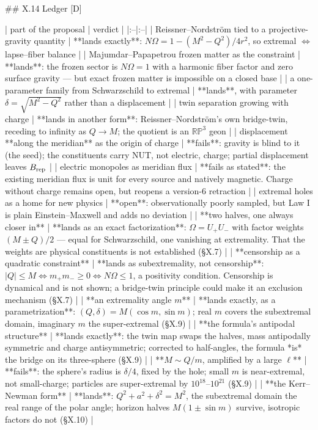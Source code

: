 ## X.14 Ledger [D]

| part of the proposal | verdict |
|:--|:--|
| Reissner–Nordström tied to a projective-gravity quantity | **lands exactly**: $N\Omega = 1-(M^2-Q^2)/4r^2$, so extremal $\Leftrightarrow$ lapse–fiber balance |
| Majumdar–Papapetrou frozen matter as the constraint | **lands**: the frozen sector is $N\Omega = 1$ with a harmonic fiber factor and zero surface gravity — but exact frozen matter is impossible on a closed base |
| a one-parameter family from Schwarzschild to extremal | **lands**, with parameter $\delta = \sqrt{M^2-Q^2}$ rather than a displacement |
| twin separation growing with charge | **lands in another form**: Reissner–Nordström's own bridge-twin, receding to infinity as $Q\to M$; the quotient is an $\mathbb{RP}^3$ geon |
| displacement **along the meridian** as the origin of charge | **fails**: gravity is blind to it (the seed); the constituents carry NUT, not electric, charge; partial displacement leaves $B_{\rm rep}$ |
| electric monopoles as meridian flux | **fails as stated**: the existing meridian flux is unit for every source and natively magnetic. Charge without charge remains open, but reopens a version-6 retraction |
| extremal holes as a home for new physics | **open**: observationally poorly sampled, but Law I is plain Einstein–Maxwell and adds no deviation |
| **two halves, one always closer in** | **lands as an exact factorization**: $\Omega = U_+U_-$ with factor weights $(M\pm Q)/2$ — equal for Schwarzschild, one vanishing at extremality. That the weights are physical constituents is not established (§X.7) |
| **censorship as a quadratic constraint** | **lands as subextremality, not censorship**: $\lvert Q\rvert\leq M\Leftrightarrow m_+m_-\geq0\Leftrightarrow N\Omega\leq1$, a positivity condition. Censorship is dynamical and is not shown; a bridge-twin principle could make it an exclusion mechanism (§X.7) |
| **an extremality angle $m$** | **lands exactly, as a parametrization**: $(Q,\delta) = M(\cos m,\sin m)$; real $m$ covers the subextremal domain, imaginary $m$ the super-extremal (§X.9) |
| **the formula's antipodal structure** | **lands exactly**: the twin map swaps the halves, mass antipodally symmetric and charge antisymmetric; corrected to half-angles, the formula *is* the bridge on its three-sphere (§X.9) |
| **$M\sim Q/m$, amplified by a large $\ell$** | **fails**: the sphere's radius is $\delta/4$, fixed by the hole; small $m$ is near-extremal, not small-charge; particles are super-extremal by $10^{18}$–$10^{21}$ (§X.9) |
| **the Kerr–Newman form** | **lands**: $Q^2+a^2+\delta^2 = M^2$, the subextremal domain the real range of the polar angle; horizon halves $M(1\pm\sin m)$ survive, isotropic factors do not (§X.10) |
